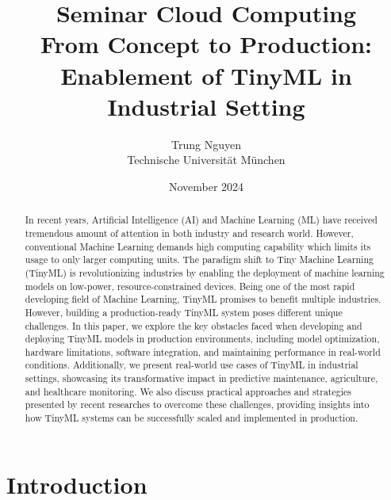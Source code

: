 \documentclass[twocolumn]{article}
\author{Trung Nguyen\\ Technische Universit\"at M\"unchen}
\title{Seminar Cloud Computing \\
       {\bf From Concept to Production: Enablement of TinyML in Industrial Setting}
}
\date{November 2024}
\begin{document}
\maketitle

\begin{abstract}
In recent years, Artificial Intelligence (AI) and Machine Learning (ML) have received tremendous amount of attention in both industry and research world. However, conventional Machine Learning demands high computing capability which limits its usage to only larger computing units. The paradigm shift to Tiny Machine Learning (TinyML) is revolutionizing industries by enabling the deployment of machine learning models on low-power, resource-constrained devices. Being one of the most rapid developing field of Machine Learning, TinyML promises to benefit multiple industries. However, building a production-ready TinyML system poses different unique challenges. In this paper, we explore the key obstacles faced when developing and deploying TinyML models in production environments, including model optimization, hardware limitations, software integration, and maintaining performance in real-world conditions. Additionally, we present real-world use cases of TinyML in industrial settings, showcasing its transformative impact in predictive maintenance, agriculture, and healthcare monitoring. We also discuss practical approaches and strategies presented by recent researches \cite{ren_tinyol_2021} to overcome these challenges, providing insights into how TinyML systems can be successfully scaled and implemented in production.
\end{abstract}

\section{Introduction}
\label{introduction}
\end{document}
